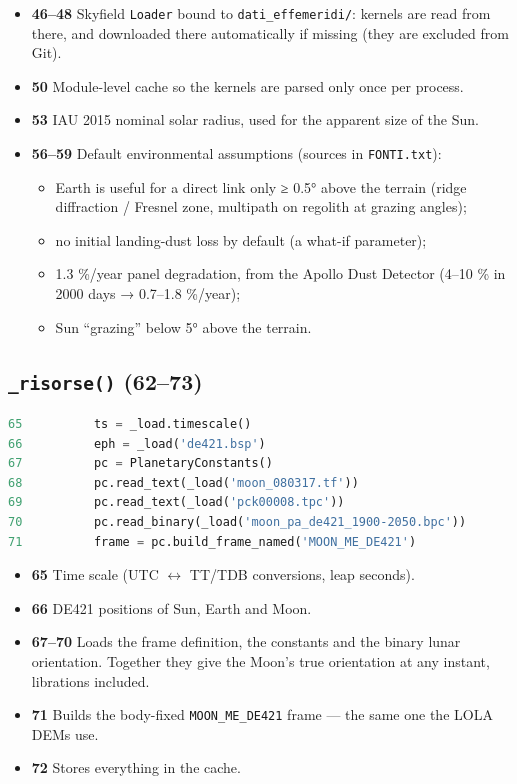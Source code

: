 \documentclass[11pt,a4paper]{article}
\providecommand{\tightlist}{\setlength{\itemsep}{0pt}\setlength{\parskip}{0pt}}
\begin{document}
\begin{itemize}
\tightlist
\item
  \textbf{46--48} Skyfield \texttt{Loader} bound to
  \texttt{dati\_effemeridi/}: kernels are read from
  there, and downloaded there automatically if missing (they are
  excluded from Git).
\item
  \textbf{50} Module-level cache so the kernels are parsed only once per
  process.
\item
  \textbf{53} IAU 2015 nominal solar radius, used for the apparent size
  of the Sun.
\item
  \textbf{56--59} Default environmental assumptions (sources in
  \texttt{FONTI.txt}):

  \begin{itemize}
  \tightlist
  \item
    Earth is useful for a direct link only ≥ 0.5° above the terrain
    (ridge diffraction / Fresnel zone, multipath on regolith at grazing
    angles);
  \item
    no initial landing-dust loss by default (a what-if parameter);
  \item
    1.3 \%/year panel degradation, from the Apollo Dust Detector (4--10
    \% in 2000 days → 0.7--1.8 \%/year);
  \item
    Sun ``grazing'' below 5° above the terrain.
  \end{itemize}
\end{itemize}

\hypertarget{risorse-6273}{%
\subsection{\texorpdfstring{\texttt{\_risorse()}
(62--73)}{\_risorse() (62--73)}}\label{risorse-6273}}

\begin{lstlisting}[language=Python]
65          ts = _load.timescale()
66          eph = _load('de421.bsp')
67          pc = PlanetaryConstants()
68          pc.read_text(_load('moon_080317.tf'))
69          pc.read_text(_load('pck00008.tpc'))
70          pc.read_binary(_load('moon_pa_de421_1900-2050.bpc'))
71          frame = pc.build_frame_named('MOON_ME_DE421')
\end{lstlisting}

\begin{itemize}
\tightlist
\item
  \textbf{65} Time scale (UTC $\leftrightarrow$ TT/TDB conversions, leap seconds).
\item
  \textbf{66} DE421 positions of Sun, Earth and Moon.
\item
  \textbf{67--70} Loads the frame definition, the constants and the
  binary lunar orientation. Together they give the Moon's true
  orientation at any instant, librations included.
\item
  \textbf{71} Builds the body-fixed
  \texttt{MOON\_ME\_DE421} frame --- the same one the
  LOLA DEMs use.
\item
  \textbf{72} Stores everything in the cache.
\end{itemize}
\end{document}

